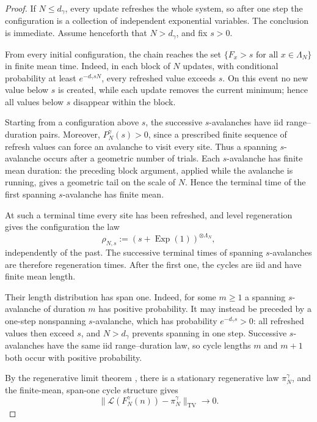 \documentclass[11pt,a4paper]{amsart}
\theoremstyle{remark}
\begin{document}
\begin{proof}
If $N\leq d_\gamma$, every update refreshes the whole system, so after
one step the configuration is a collection of independent exponential
variables. The conclusion is immediate. Assume henceforth that
$N>d_\gamma$, and fix $s>0$.

From every initial configuration, the chain reaches the set
$\{F_x>s\text{ for all }x\in\Lambda_N\}$ in finite mean time. Indeed,
in each block of $N$ updates, with conditional probability at least
$e^{-d_\gamma sN}$, every refreshed value exceeds $s$. On this event
no new value below $s$ is created, while each update removes the
current minimum; hence all values below $s$ disappear within the block.

Starting from a configuration above $s$, the successive $s$-avalanches
have iid range--duration pairs. Moreover, $P_N^\gamma(s)>0$, since a
prescribed finite sequence of refresh values can force an avalanche to
visit every site. Thus a spanning $s$-avalanche occurs after a
geometric number of trials. Each $s$-avalanche has finite mean duration:
the preceding block argument, applied while the avalanche is running,
gives a geometric tail on the scale of $N$. Hence the terminal time of
the first spanning $s$-avalanche has finite mean.

At such a terminal time every site has been refreshed, and level
regeneration gives the configuration the law
\[
        \rho_{N,s}:=
        (s+\operatorname{Exp}(1))^{\otimes\Lambda_N},
\]
independently of the past. The successive terminal times of spanning
$s$-avalanches are therefore regeneration times. After the first one,
the cycles are iid and have finite mean length.

Their length distribution has span one. Indeed, for some $m\geq1$ a
spanning $s$-avalanche of duration $m$ has positive probability. It
may instead be preceded by a one-step nonspanning $s$-avalanche, which
has probability $e^{-d_\gamma s}>0$: all refreshed values then exceed
$s$, and $N>d_\gamma$ prevents spanning in one step. Successive
$s$-avalanches have the same iid range--duration law, so cycle lengths
$m$ and $m+1$ both occur with positive probability.


By the regenerative limit theorem
\cite[Theorem~VI.1.2 and Corollary~VI.1.5, pp.~170--171]{Asmussen2003},
there is a stationary regenerative law $\pi_N^\gamma$, and the
finite-mean, span-one cycle structure gives
\[
        \bigl\|
        \mathcal L(F_N^\gamma(n))-\pi_N^\gamma
        \bigr\|_{\mathrm{TV}}
        \longrightarrow0 .
\]



\end{proof}
\end{document}
